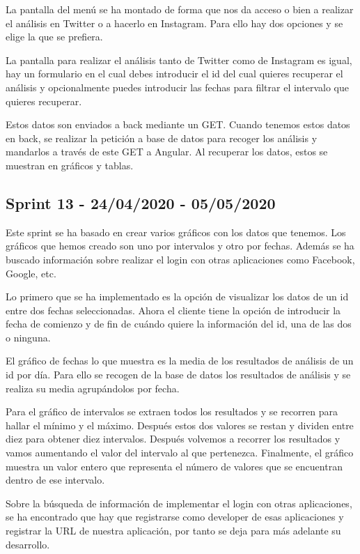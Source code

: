 La pantalla del menú se ha montado de forma que nos da acceso o bien a realizar el análisis en Twitter o a hacerlo en Instagram. Para ello hay dos opciones y se elige la que se prefiera.

La pantalla para realizar el análisis tanto de Twitter como de Instagram es igual, hay un formulario en el cual debes introducir el id del cual quieres recuperar el análisis y opcionalmente puedes introducir las fechas para filtrar el intervalo que quieres recuperar.

Estos datos son enviados a back mediante un GET. Cuando tenemos estos datos en back, se realizar la petición a base de datos para recoger los análisis y mandarlos a través de este GET a Angular. 
Al recuperar los datos, estos se muestran en gráficos y tablas.


\subsection{Sprint 13 - 24/04/2020 - 05/05/2020}
Este sprint se ha basado en crear varios gráficos con los datos que tenemos. Los gráficos que hemos creado son uno por intervalos y otro por fechas. Además se ha buscado información sobre realizar el login con otras aplicaciones como Facebook, Google, etc.

Lo primero que se ha implementado es la opción de visualizar los datos de un id entre dos fechas seleccionadas. Ahora el cliente tiene la opción de introducir la fecha de comienzo y de fin de cuándo quiere la información del id, una de las dos o ninguna.

El gráfico de fechas lo que muestra es la media de los resultados de análisis de un id por día. Para ello se recogen de la base de datos los resultados de análisis y se realiza su media agrupándolos por fecha.

Para el gráfico de intervalos se extraen todos los resultados y se recorren para hallar el mínimo y el máximo. Después estos dos valores se restan y dividen entre diez para obtener diez intervalos.
Después volvemos a recorrer los resultados y vamos aumentando el valor del intervalo al que pertenezca.
Finalmente, el gráfico muestra un valor entero que representa el número de valores que se encuentran dentro de ese intervalo.

Sobre la búsqueda de información de implementar el login con otras aplicaciones, se ha encontrado que hay que registrarse como developer de esas aplicaciones y registrar la URL de nuestra aplicación, por tanto se deja para más adelante su desarrollo.

